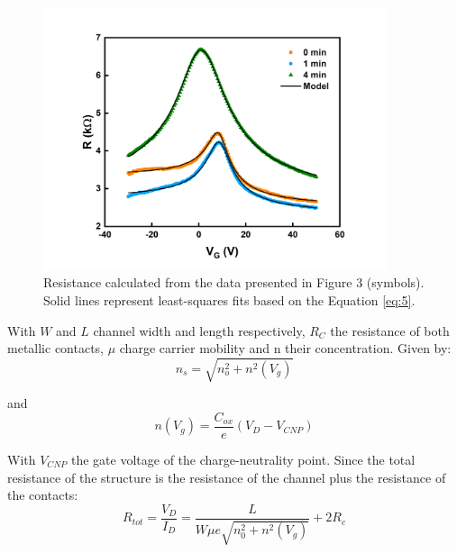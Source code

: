 \documentclass[preprint,aip,jap]{revtex4-2}
\begin{document}
\begin{figure}[htb]
  \centering
   \includegraphics[width=0.9\textwidth]{./Figures/fig4}  
  \caption{Resistance calculated from the data presented in Figure 3 (symbols). Solid lines represent least-squares fits based on the Equation \ref{eq:5}.}
  \label{fig:4}
\end{figure}

\noindent With $W$ and $L$ channel width and length respectively, $R_{C}$ the resistance of both metallic contacts, $\mu$ charge carrier mobility and n their concentration. Given by:
\begin{equation}
  \label{eq:3}
  n_{s}=\sqrt{n_{o}^{2}+n^{2}(V_{g})}
\end{equation}

and 
\begin{equation}
  \label{eq:4}
  n(V_{g})= \frac{C_{ox}}{e}(V_{D}- V_{CNP})
\end{equation}


\noindent With $V_{CNP}$ the gate voltage of the charge-neutrality point\cite{xia-2010}. Since the total resistance of the structure is the resistance of the channel plus the resistance of the contacts:
\begin{equation}
  \label{eq:5}
  R_{tot} = \frac{V_{D}}{I_{D}} = \frac{L}{W\mu e\sqrt{n_{0}^{2}+n^{2}(V_{g})}} +2 R_{c}
\end{equation}
\end{document}
